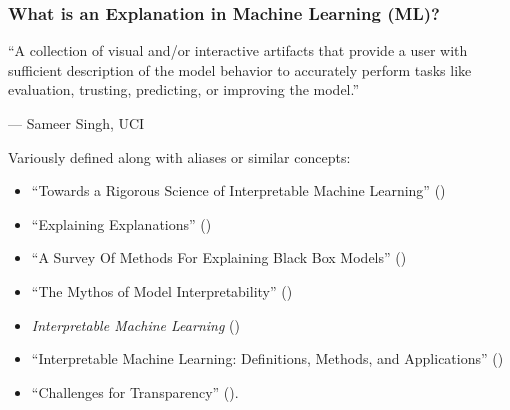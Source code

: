 \documentclass[11pt,aspectratio=169,hyperref={colorlinks}]{beamer}
\begin{document}
	\begin{frame}[t]
		
		\frametitle{What is an Explanation in Machine Learning (ML)?}
		
		\epigraph{“A collection of visual and/or interactive artifacts that provide a user with sufficient description of the model behavior to accurately perform tasks like evaluation, trusting, predicting, or improving the model.”}{--- \textup{Sameer Singh}, UCI}		
		
		\scriptsize Variously defined along with aliases or similar concepts:
		\begin{itemize}\scriptsize
			\item ``Towards a Rigorous Science of Interpretable Machine Learning'' (\citet{been_kim1})
			\item ``Explaining Explanations'' (\citet{gilpin2018explaining})
			\item ``A Survey Of Methods For Explaining Black Box Models'' (\citet{guidotti2018survey})
			\item ``The Mythos of Model Interpretability'' (\citet{lipton1})
		 	\item \textit{Interpretable Machine Learning} (\citet{molnar})
			\item ``Interpretable Machine Learning: Definitions, Methods, and Applications'' (\citet{murdoch2019interpretable})
			\item ``Challenges for Transparency'' (\citet{weller2017challenges}). 
		\end{itemize}\normalsize
		
	\end{frame}
	
\end{document}
